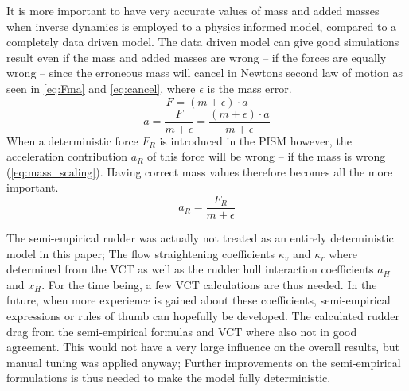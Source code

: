 It is more important to have very accurate values of mass and added masses when inverse dynamics is employed to a physics informed model, compared to a completely data driven model.
The data driven model can give good simulations result even if the mass and added masses are wrong -- if the forces are equally wrong -- since the erroneous mass will cancel in Newtons second law of motion as seen in \autoref{eq:Fma} and \autoref{eq:cancel}, where $\epsilon$ is the mass error.
\begin{equation}
    \label{eq:Fma}
    F = (m+\epsilon) \cdot a
\end{equation}
\begin{equation}
    \label{eq:cancel}
    a = \frac{F}{m+\epsilon} = \frac{(m+\epsilon) \cdot a}{m+\epsilon}
\end{equation}
When a deterministic force $F_R$ is introduced in the PISM however, the acceleration contribution $a_R$ of this force will be wrong -- if the mass is wrong (\autoref{eq:mass_scaling}). Having correct mass values therefore becomes all the more important.
\begin{equation}
    \label{eq:mass_scaling}
    a_R = \frac{F_R}{m+\epsilon}
\end{equation}

The semi-empirical rudder was actually not treated as an entirely deterministic model in this paper; The flow straightening coefficients $\kappa_v$ and $\kappa_r$ where determined from the VCT as well as the rudder hull interaction coefficients $a_H$ and $x_H$. For the time being, a few VCT calculations are thus needed. In the future, when more experience is gained about these coefficients, semi-empirical expressions or rules of thumb can hopefully be developed.
The calculated rudder drag from the semi-empirical formulas and VCT where also not in good agreement.
This would not have a very large influence on the overall results, but manual tuning was applied anyway;
Further improvements on the semi-empirical formulations is thus needed to make the model fully deterministic.
